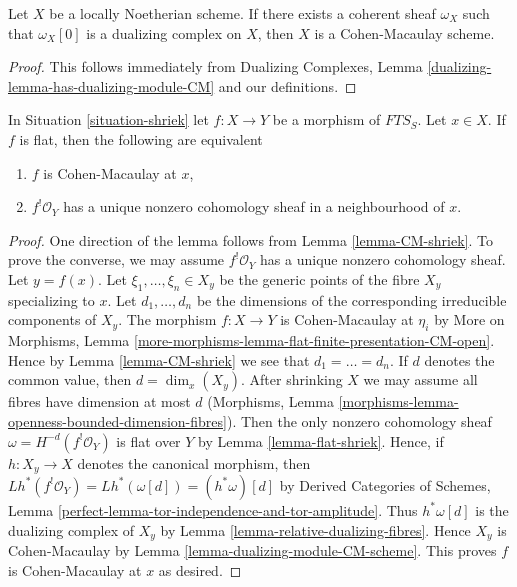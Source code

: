\begin{lemma}
\label{lemma-has-dualizing-module-CM-scheme}
Let $X$ be a locally Noetherian scheme. If there exists a coherent sheaf
$\omega_X$ such that $\omega_X[0]$ is a dualizing complex on $X$, then
$X$ is a Cohen-Macaulay scheme.
\end{lemma}

\begin{proof}
This follows immediately from
Dualizing Complexes, Lemma \ref{dualizing-lemma-has-dualizing-module-CM}
and our definitions.
\end{proof}

\begin{lemma}
\label{lemma-affine-flat-Noetherian-CM}
In Situation \ref{situation-shriek} let $f : X \to Y$ be a morphism
of $\textit{FTS}_S$. Let $x \in X$. If $f$ is flat, then
the following are equivalent
\begin{enumerate}
\item $f$ is Cohen-Macaulay at $x$,
\item $f^!\mathcal{O}_Y$ has a unique nonzero cohomology sheaf
in a neighbourhood of $x$.
\end{enumerate}
\end{lemma}

\begin{proof}
One direction of the lemma follows from Lemma \ref{lemma-CM-shriek}.
To prove the converse, we may assume $f^!\mathcal{O}_Y$ has a unique
nonzero cohomology sheaf. Let $y = f(x)$. Let $\xi_1, \ldots, \xi_n \in X_y$
be the generic points of the fibre $X_y$ specializing to $x$.
Let $d_1, \ldots, d_n$ be the dimensions of the corresponding
irreducible components of $X_y$. The morphism $f : X \to Y$ is Cohen-Macaulay
at $\eta_i$ by More on Morphisms, Lemma
\ref{more-morphisms-lemma-flat-finite-presentation-CM-open}.
Hence by Lemma \ref{lemma-CM-shriek} we see that
$d_1 = \ldots = d_n$. If $d$ denotes the common value, then $d = \dim_x(X_y)$.
After shrinking $X$ we may assume all fibres have dimension at most $d$
(Morphisms, Lemma \ref{morphisms-lemma-openness-bounded-dimension-fibres}).
Then the only nonzero cohomology sheaf $\omega = H^{-d}(f^!\mathcal{O}_Y)$
is flat over $Y$ by Lemma \ref{lemma-flat-shriek}.
Hence, if $h : X_y \to X$ denotes the canonical morphism, then
$Lh^*(f^!\mathcal{O}_Y) = Lh^*(\omega[d]) = (h^*\omega)[d]$
by Derived Categories of Schemes, Lemma
\ref{perfect-lemma-tor-independence-and-tor-amplitude}.
Thus $h^*\omega[d]$ is the dualizing complex of $X_y$ by
Lemma \ref{lemma-relative-dualizing-fibres}.
Hence $X_y$ is Cohen-Macaulay by
Lemma \ref{lemma-dualizing-module-CM-scheme}.
This proves $f$ is Cohen-Macaulay at $x$ as desired.
\end{proof}


